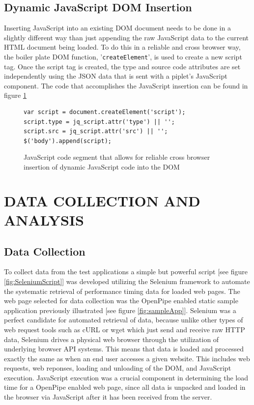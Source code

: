 \documentclass[12pt]{report}
\begin{document}
\section{Dynamic JavaScript DOM Insertion}
Inserting JavaScript into an existing DOM document needs to be done in a slightly different way than just appending the raw JavaScript data to the current HTML document being loaded. To do this in a reliable and cross browser way, the boiler plate DOM function, '\texttt{createElement}', is used to create a new script tag. Once the script tag is created, the type and source code attributes are set independently using the JSON data that is sent with a piplet's JavaScript component. The code that accomplishes the JavaScript insertion can be found in figure \ref{fig:JavaScriptInsertion}

\begin{figure}[H]
\begin{lstlisting}
var script = document.createElement('script');
script.type = jq_script.attr('type') || '';
script.src = jq_script.attr('src') || '';
$('body').append(script);
\end{lstlisting}
\caption{JavaScript code segment that allows for reliable cross browser insertion of dynamic JavaScript code into the DOM}
\label{fig:JavaScriptInsertion}
\end{figure}

\chapter{DATA COLLECTION AND ANALYSIS}

\section{Data Collection}
To collect data from the test applications a simple but powerful script [see figure \ref{fig:SeleniumScript}] was developed utilizing the Selenium framework to automate the systematic retrieval of performance timing data for loaded web pages. The web page selected for data collection was the OpenPipe enabled static sample application previously illustrated [see figure \ref{fig:sampleApp}].  Selenium was a perfect candidate for automated retrieval of data, because unlike other types of web request tools such as cURL or wget which just send and receive raw HTTP data, Selenium drives a physical web browser through the utilization of underlying browser API systems. This means that data is loaded and processed exactly the same as when an end user accesses a given website. This includes web requests, web reponses,  loading and unloading of the DOM,  and JavaScript execution. JavaScript execution was a crucial component in determining the load time for a OpenPipe enabled web page, since all data is unpacked and loaded in the browser via JavaScript after it has been received from the server.
\end{document}
